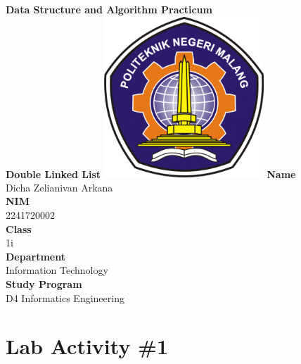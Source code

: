 \documentclass[12pt,titlepage]{article}
\newcommand{\vSubject}{Data Structure and Algorithm Practicum}
\newcommand{\vSubtitle}{Double Linked List}
\newcommand{\vName}{Dicha Zelianivan Arkana}
\newcommand{\vNIM}{2241720002}
\newcommand{\vClass}{1i}
\newcommand{\vDepartment}{Information Technology}
\newcommand{\vStudyProgram}{D4 Informatics Engineering}
\begin{document}
\begin{titlepage}
    \centering
    \vfill
    {\bfseries\LARGE
        \vSubject\\
        \vskip0.25cm
        \vSubtitle
    }
    \vfill
    \includegraphics[width=6cm]{images/polinema-logo.png}
    \vfill
    {
        \textbf{Name}\\
        \vName\\
        \vskip0.5cm
        \textbf{NIM}\\
        \vNIM\\
        \vskip0.5cm
        \textbf{Class}\\
        \vClass\\
        \vskip0.5cm
        \textbf{Department}\\
        \vDepartment\\
        \vskip0.5cm
        \textbf{Study Program}\\
        \vStudyProgram
    }
\end{titlepage}

\section*{Lab Activity \#1}
\end{document}
